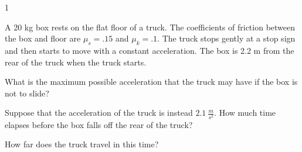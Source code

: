 
\AddToShipoutPicture*{\BackgroundPic}

\addtocounter {ProbNum} {1}

 
{\bf \Large{}} A 20 kg box rests on the flat floor of a truck. The coefficients of friction between the box and floor are ${\mu_s=.15}$ and ${\mu_k=.1}$. The truck stops gently at a stop sign and then starts to move with a constant acceleration. The box is 2.2 m from the rear of the truck when the truck starts.

\bigskip
What is the maximum possible acceleration that the truck may have if the box is not to slide?

\vfill
Suppose that the acceleration of the truck is instead ${2.1~\tfrac{m}{s^2}}$. How much time elapses before the box falls off the rear of the truck? 

\vfill
How far does the truck travel in this time?



\vfill
\newpage
